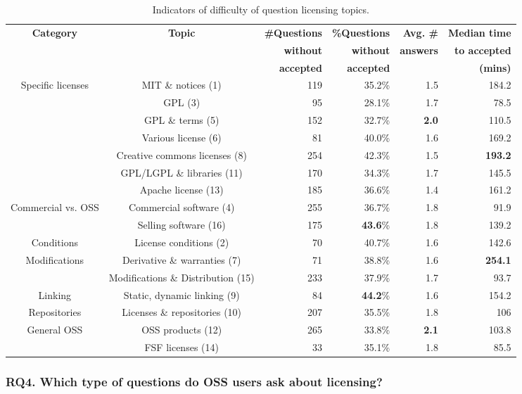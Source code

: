 \documentclass{elsarticle}
\begin{document}
\begin{table}
  \caption{Indicators of difficulty of question licensing topics.}
  \label{tab:topics-difficulty}
  \centering
  \begin{adjustbox}{width=0.99\textwidth}
  \begin{tabular}{ccrrrr}
    \hline
     \textbf{Category} & \textbf{Topic} & \textbf{\#Questions} & \textbf{\%Questions} & \textbf{Avg. \#} & \textbf{Median time} \\
     &&\textbf{without}&\textbf{without} &\textbf{answers}& \textbf{to accepted}\\
     && \textbf{accepted} &\textbf{accepted} && \textbf{(mins)}\\
     \hline
Specific licenses&MIT \& notices (1) &	119& 35.2\% & 1.5 &184.2\\
&GPL (3)	&95 &28.1\% & 1.7 &78.5\\
&GPL \& terms (5)	&152 &32.7\% & \textbf{2.0} &110.5\\
&Various license (6)	&81 &40.0\% &1.6 &169.2\\
&Creative commons licenses (8)	&254 &42.3\% &1.5 &\textbf{193.2}\\
&GPL/LGPL \& libraries (11)	&170 &34.3\% &1.7 &145.5\\
&Apache license (13)	&185 &36.6\% & 1.4&161.2\\
\hline
Commercial vs. OSS&Commercial software (4)	&255 & 36.7\%&1.8 &91.9\\
&Selling software (16)	&175 &\textbf{43.6}\% &1.8 &139.2\\
\hline
Conditions &License conditions (2)	&70 & 40.7\%&1.6 &142.6\\
\hline
Modifications &Derivative \& warranties (7)	&71 & 38.8\%& 1.6&\textbf{254.1}\\
&Modifications \& Distribution (15)	&233 &37.9\% &1.7 &93.7\\
\hline
Linking & Static, dynamic linking (9)&84 & \textbf{44.2}\%& 1.6&154.2\\
\hline
Repositories &Licenses \& repositories (10)	&207 & 35.5\%& 1.8&106\\
\hline
General OSS&OSS products (12)	&265 & 33.8\%& \textbf{2.1}&103.8\\
&FSF licenses (14)	&33 &35.1\% &1.8& 85.5\\
  \hline
\end{tabular}
\end{adjustbox}
\end{table}

\subsubsection{\textbf{RQ4}. Which type of questions do OSS users ask about licensing?}
\end{document}
